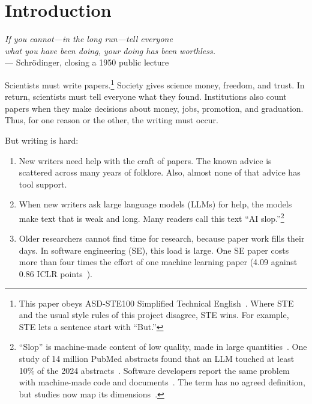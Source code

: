 \section{Introduction}

\begin{flushright}
{\em If you cannot---in the long run---tell everyone\\ what you have
been doing, your doing has been worthless.}\\ --- Schr\"odinger,
closing a 1950 public lecture~\cite{schrodinger51}
\end{flushright}

Scientists must write papers.\footnote{This paper obeys ASD-STE100
Simplified Technical English~\cite{asdste25}.
Where STE and the usual style rules of this project disagree, STE
wins.
For example, STE lets a sentence start with ``But.''}
Society gives science money, freedom, and trust.
In return, scientists must tell everyone what they found.
Institutions also count papers when they make decisions about money,
jobs, promotion, and graduation.
Thus, for one reason or the other, the writing must occur.

But writing is hard:
\begin{enumerate}
\item New writers need help with the craft of papers.
The known advice is scattered across many years of folklore.
Also, almost none of that advice has tool support.
\item When new writers ask large language models (LLMs) for help, the
models make text that is weak and long.
Many readers call this text ``AI slop.''\footnote{``Slop'' is
machine-made content of low quality, made in large
quantities~\cite{mw25slop}.
One study of 14 million PubMed abstracts found that an LLM touched at
least 10\% of the 2024 abstracts~\cite{kobak24}.
Software developers report the same problem with machine-made code and
documents~\cite{baltes26}.
The term has no agreed definition, but studies now map its
dimensions~\cite{shaib25}.}
\item Older researchers cannot find time for research, because paper
work fills their days.
In software engineering (SE), this load is large.
One SE paper costs more than four times the effort of one machine
learning paper (4.09 against 0.86 ICLR
points~\cite{luo25,menzies26se}).
\end{enumerate}

